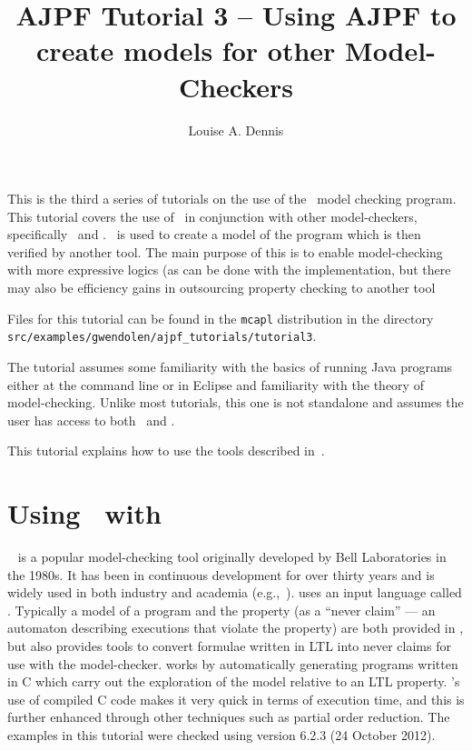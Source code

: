\documentclass[a4]{article}
\author{Louise A. Dennis}
\title{AJPF Tutorial 3 -- Using AJPF to create models for other Model-Checkers}
\begin{document}
\maketitle
This is the third a series of tutorials on the use of the \ajpf\ model checking program.  This tutorial covers the use of \ajpf\ in conjunction with other model-checkers, specifically \spin\ and \prism.  \ajpf\ is used to create a model of the program which is then verified by another tool.  The main purpose of this is to enable model-checking with more expressive logics (as can be done with the \prism\) implementation, but there may also be efficiency gains in outsourcing property checking to another tool

Files for this tutorial can be found in the \texttt{mcapl} distribution in the directory \texttt{src/examples/gwendolen/ajpf\_tutorials/tutorial3}.

The tutorial assumes some familiarity with the basics of running Java programs either at the command line or in Eclipse and familiarity with the theory of model-checking.  Unlike most tutorials, this one is not standalone and assumes the user has access to both \spin\ and \prism.

This tutorial explains how to use the tools described in~\cite{dennis15:two}.

\section{Using \ajpf\ with \spin}

\spin{}~\cite{holzmann04spin} is a popular model-checking tool
originally developed by Bell Laboratories in the 1980s.  It has been
in continuous development for over thirty years and is widely used in
both industry and academia
(e.g.,~\cite{havelund00formal,kars96application,kirsch11technical}).
\spin{} uses an input language called \promela{}.  Typically a model
of a program and the property (as a ``never claim'' --- an automaton
describing executions that violate the property) are both provided in
\promela{}, but \spin{} also provides tools to convert formulae
written in LTL into never claims for use with the
model-checker. \spin{} works by automatically generating programs
written in C which carry out the exploration of the model relative to
an LTL property. \spin{}'s use of compiled C code makes it very quick
in terms of execution time, and this is further enhanced through other
techniques such as partial order reduction. The examples in this tutorial were checked using \spin{} version 6.2.3 (24 October 2012).


\end{document}
